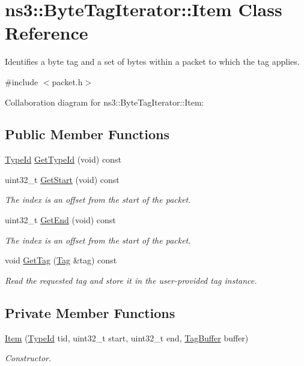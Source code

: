 \hypertarget{classns3_1_1ByteTagIterator_1_1Item}{}\section{ns3\+:\+:Byte\+Tag\+Iterator\+:\+:Item Class Reference}
\label{classns3_1_1ByteTagIterator_1_1Item}


Identifies a byte tag and a set of bytes within a packet to which the tag applies.  




{\ttfamily \#include $<$packet.\+h$>$}



Collaboration diagram for ns3\+:\+:Byte\+Tag\+Iterator\+:\+:Item\+:
\subsection*{Public Member Functions}
\begin{DoxyCompactItemize}
\item 
\hyperlink{classns3_1_1TypeId}{Type\+Id} \hyperlink{classns3_1_1ByteTagIterator_1_1Item_aaae5fe08c2b67ac485faa4372fe38cea}{Get\+Type\+Id} (void) const 
\item 
uint32\+\_\+t \hyperlink{classns3_1_1ByteTagIterator_1_1Item_abaf7c97dec29431934732d656361d13c}{Get\+Start} (void) const 
\begin{DoxyCompactList}\small\item\em The index is an offset from the start of the packet. \end{DoxyCompactList}\item 
uint32\+\_\+t \hyperlink{classns3_1_1ByteTagIterator_1_1Item_a47e206d7530bd378c26a55f206deefea}{Get\+End} (void) const 
\begin{DoxyCompactList}\small\item\em The index is an offset from the start of the packet. \end{DoxyCompactList}\item 
void \hyperlink{classns3_1_1ByteTagIterator_1_1Item_ada7f72efd4a0d9caef5edae0ea571ec1}{Get\+Tag} (\hyperlink{classns3_1_1Tag}{Tag} \&tag) const 
\begin{DoxyCompactList}\small\item\em Read the requested tag and store it in the user-\/provided tag instance. \end{DoxyCompactList}\end{DoxyCompactItemize}
\subsection*{Private Member Functions}
\begin{DoxyCompactItemize}
\item 
\hyperlink{classns3_1_1ByteTagIterator_1_1Item_a9075dd87cf45e747702d50e07c81f90a}{Item} (\hyperlink{classns3_1_1TypeId}{Type\+Id} tid, uint32\+\_\+t start, uint32\+\_\+t end, \hyperlink{classns3_1_1TagBuffer}{Tag\+Buffer} buffer)
\begin{DoxyCompactList}\small\item\em Constructor. \end{DoxyCompactList}\end{DoxyCompactItemize}

